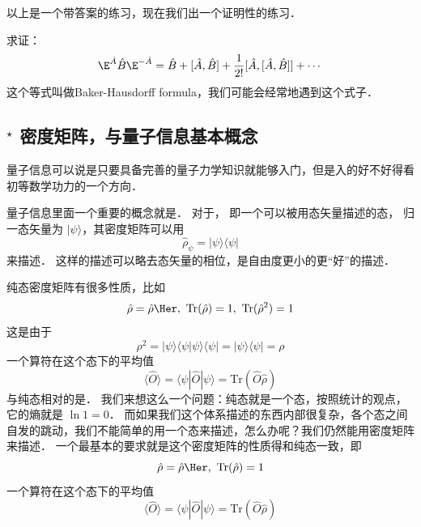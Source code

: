 以上是一个带答案的练习，现在我们出一个证明性的练习．

\begin{exer}{}
求证：
\begin{equation}
\E^{\hat A}\hat B \E^{-\hat A} = \hat{B} + [\hat A,\hat B] + \frac{1}{2!} [\hat A, [\hat A,\hat B]] + \cdots
\end{equation}
这个等式叫做Baker-Hausdorff formula，我们可能会经常地遇到这个式子．
\end{exer}

\subsection{$^\star$ 密度矩阵，与量子信息基本概念}

量子信息可以说是只要具备完善的量子力学知识就能够入门，但是入的好不好得看初等数学功力的一个方向．

量子信息里面一个重要的概念就是． 对于， 即一个可以被用态矢量描述的态， 归一态矢量为 $|\psi\rangle$，其密度矩阵可以用
\begin{equation}
\hat\rho_{\psi} = |\psi\rangle\langle\psi|
\end{equation}
来描述． 这样的描述可以略去态矢量的相位，是自由度更小的更“好”的描述．

纯态密度矩阵有很多性质，比如
\begin{equation}
\hat\rho = \hat\rho\Her,\ \text{Tr}(\hat\rho) = 1,\ \text{Tr}(\hat\rho^2) = 1
\end{equation}
这是由于
\begin{equation}
\rho^2 = |\psi\rangle\langle\psi|\psi\rangle\langle\psi| = |\psi\rangle\langle\psi| = \rho
\end{equation}
一个算符在这个态下的平均值
\begin{equation}
\langle\hat O\rangle = \langle\psi|\hat O|\psi\rangle = \text{Tr}(\hat O\hat \rho)
\end{equation}
与纯态相对的是． 我们来想这么一个问题：纯态就是一个态，按照统计的观点，它的熵就是 $\ln 1 = 0$． 而如果我们这个体系描述的东西内部很复杂，各个态之间自发的跳动，我们不能简单的用一个态来描述，怎么办呢？我们仍然能用密度矩阵来描述． 一个最基本的要求就是这个密度矩阵的性质得和纯态一致，即
\begin{equation}
\hat\rho = \hat\rho\Her,\ \text{Tr}(\hat\rho) = 1
\end{equation}
一个算符在这个态下的平均值
\begin{equation}
\langle\hat O\rangle = \langle\psi|\hat O|\psi\rangle = \text{Tr}(\hat O\hat \rho)
\end{equation}

